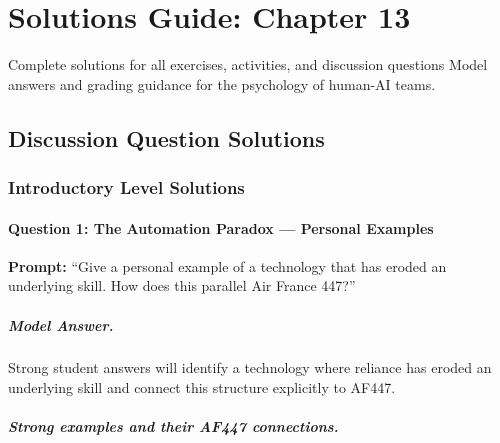 
\chapter{Solutions Guide: Chapter 13}
\label{ch:solutions-ch13}

\begin{chapterquote}{Complete solutions for all exercises, activities, and discussion questions}
Model answers and grading guidance for the psychology of human-AI teams.
\end{chapterquote}

\section{Discussion Question Solutions}

\subsection{Introductory Level Solutions}

\subsubsection{Question 1: The Automation Paradox --- Personal Examples}

\textbf{Prompt:} ``Give a personal example of a technology that has eroded an underlying skill. How does this parallel Air France 447?''

\paragraph{Model Answer.}

Strong student answers will identify a technology where reliance has eroded an underlying skill and connect this structure explicitly to AF447.

\paragraph{Strong examples and their AF447 connections.}

